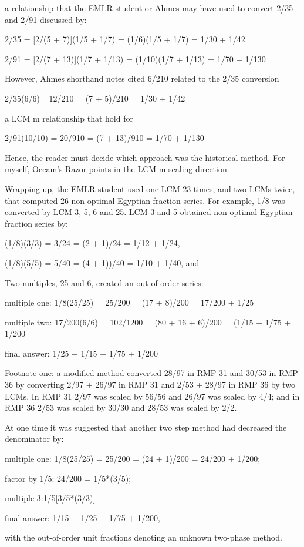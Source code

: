 \documentclass[12pt]{article}
\begin{document}
a relationship that the EMLR student or Ahmes may have used to convert 2/35 and 2/91 discussed by:

2/35 = [2/(5 + 7)](1/5 + 1/7) = (1/6)(1/5 + 1/7) = 1/30 + 1/42

2/91 = [2/(7 + 13)](1/7 + 1/13) = (1/10)(1/7 + 1/13) = 1/70 + 1/130  

However, Ahmes shorthand notes cited 6/210 related to the 2/35 conversion

2/35(6/6)= 12/210 = (7 + 5)/210 = 1/30 + 1/42

a LCM m relationship that hold for

2/91(10/10) = 20/910 = (7 + 13)/910 = 1/70 + 1/130 

Hence, the reader must decide which approach was the historical method. For myself, Occam's Razor points in the LCM m scaling direction.

Wrapping up, the EMLR student used one LCM 23 times, and two LCMs twice, that computed 26 non-optimal Egyptian fraction series. For example, 1/8 was converted by LCM 3, 5, 6 and 25.  LCM 3 and 5 obtained non-optimal Egyptian fraction series by:

(1/8)(3/3) = 3/24 = (2 + 1)/24 = 1/12 + 1/24, 

(1/8)(5/5) = 5/40 = (4 + 1))/40 = 1/10 + 1/40, and

Two multiples, 25 and 6, created an out-of-order series: 

multiple one: 1/8(25/25) = 25/200 = (17 + 8)/200 =  17/200 + 1/25

multiple two: 17/200(6/6) = 102/1200 = (80 + 16 + 6)/200 = (1/15 + 1/75 + 1/200 

final answer: 1/25 + 1/15 + 1/75 + 1/200

Footnote one: a modified method converted 28/97 in RMP 31 and 30/53 in RMP 36 by converting 2/97 + 26/97 in RMP 31 and 2/53 + 28/97 in RMP 36 by two LCMs.  In RMP 31 2/97 was scaled by 56/56 and 26/97 was scaled by 4/4; and in RMP 36 2/53 was scaled by 30/30 and 28/53 was scaled by 2/2.

At one time it was suggested that another two step method had decreased the denominator by:

multiple one: 1/8(25/25) = 25/200 = (24 + 1)/200 = 24/200 + 1/200;

factor by 1/5: 24/200 = 1/5*(3/5);

multiple 3:1/5[3/5*(3/3)]

final answer: 1/15 + 1/25 + 1/75 + 1/200, 

with the out-of-order unit fractions denoting an unknown two-phase method.
\end{document}
